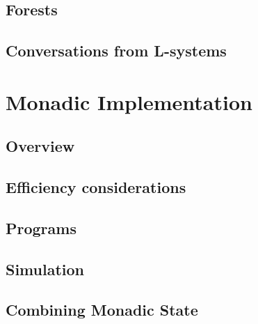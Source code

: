 \subsection{Forests}


\subsection{Conversations from L-systems}

\newpage
\section{Monadic Implementation}

    \label{dsel_impl}
    \label{monadic_impl}


\subsection{Overview}


\subsection{Efficiency considerations}


\subsection{Programs}

\subsection{Simulation}


\subsection{Combining Monadic State}

